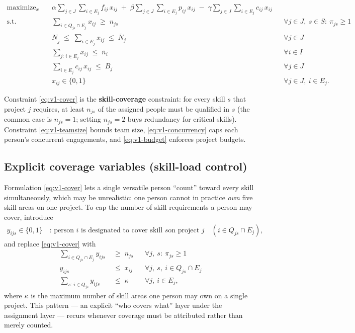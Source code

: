 \documentclass[11pt]{article}
\newcommand{\B}{\{0,1\}}
\DeclareMathOperator*{\maximize}{maximize}
\theoremstyle{remark}
\begin{document}
\begin{align}
\maximize_{x} \quad
  & \alpha \sum_{j \in J} \sum_{i \in E_j} f_{ij}\, x_{ij}
  \;+\; \beta \sum_{j \in J} \sum_{i \in E_j} p_{ij}\, x_{ij}
  \;-\; \gamma \sum_{j \in J} \sum_{i \in E_j} c_{ij}\, x_{ij}
  \label{eq:v1-obj} \\[4pt]
\text{s.t.} \quad
  & \sum_{i \in Q_{js} \cap E_j} x_{ij} \;\ge\; n_{js}
  && \forall j \in J,\ s \in S:\ \pi_{js} \ge 1
  \label{eq:v1-cover} \\
  & \underline{N}_j \;\le\; \sum_{i \in E_j} x_{ij} \;\le\; \overline{N}_j
  && \forall j \in J
  \label{eq:v1-teamsize} \\
  & \sum_{j:\, i \in E_j} x_{ij} \;\le\; \overline{n}_i
  && \forall i \in I
  \label{eq:v1-concurrency} \\
  & \sum_{i \in E_j} c_{ij}\, x_{ij} \;\le\; B_j
  && \forall j \in J
  \label{eq:v1-budget} \\
  & x_{ij} \in \B
  && \forall j \in J,\ i \in E_j. \nonumber
\end{align}

Constraint \eqref{eq:v1-cover} is the \textbf{skill-coverage} constraint:
for every skill $s$ that project $j$ requires, at least $n_{js}$ of the
assigned people must be qualified in $s$ (the common case is
$n_{js} = 1$; setting $n_{js} = 2$ buys redundancy for critical skills).
Constraint \eqref{eq:v1-teamsize} bounds team size,
\eqref{eq:v1-concurrency} caps each person's concurrent engagements, and
\eqref{eq:v1-budget} enforces project budgets.

\subsection{Explicit coverage variables (skill-load control)}
\label{sec:v1-explicit}

Formulation \eqref{eq:v1-cover} lets a single versatile person
``count'' toward every skill simultaneously, which may be unrealistic: one
person cannot in practice \emph{own} five skill areas on one project. To
cap the number of skill requirements a person may cover, introduce
\begin{align*}
y_{ijs} \in \B \quad \text{: person $i$ is designated to cover skill $s$
on project $j$} \quad (i \in Q_{js} \cap E_j),
\end{align*}
and replace \eqref{eq:v1-cover} with
\begin{align}
\sum_{i \in Q_{js} \cap E_j} y_{ijs} &\;\ge\; n_{js}
  && \forall j,\ s:\ \pi_{js} \ge 1
  \label{eq:v1b-cover} \\
y_{ijs} &\;\le\; x_{ij}
  && \forall j,\ s,\ i \in Q_{js} \cap E_j
  \label{eq:v1b-link} \\
\sum_{s:\, i \in Q_{js}} y_{ijs} &\;\le\; \kappa
  && \forall j,\ i \in E_j,
  \label{eq:v1b-load}
\end{align}
where $\kappa$ is the maximum number of skill areas one person may own on a
single project. This pattern --- an explicit ``who covers what'' layer under
the assignment layer --- recurs whenever coverage must be attributed rather
than merely counted.
\end{document}
